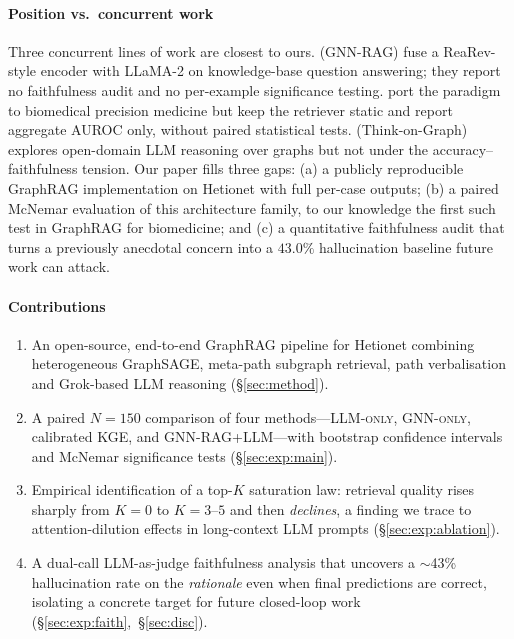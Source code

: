 \documentclass{article}
\newcommand{\ours}{\textsc{GNN-RAG+LLM}\xspace}
\newcommand{\gnno}{\textsc{GNN-only}\xspace}
\newcommand{\llmo}{\textsc{LLM-only}\xspace}
\newcommand{\kge}{\textsc{KGE}\xspace}
\begin{document}
\paragraph{Position vs.\ concurrent work}
Three concurrent lines of work are closest to ours. \citet{mavromatis2024gnnrag} (GNN-RAG) fuse a ReaRev-style encoder with LLaMA-2 on knowledge-base question answering; they report no faithfulness audit and no per-example significance testing. \citet{hays2026raggnn} port the paradigm to biomedical precision medicine but keep the retriever static and report aggregate AUROC only, without paired statistical tests. \citet{sun2024tog} (Think-on-Graph) explores open-domain LLM reasoning over graphs but not under the accuracy--faithfulness tension. Our paper fills three gaps: (a) a publicly reproducible GraphRAG implementation on Hetionet with full per-case outputs; (b) a paired McNemar evaluation of this architecture family, to our knowledge the first such test in GraphRAG for biomedicine; and (c) a quantitative faithfulness audit that turns a previously anecdotal concern into a $43.0\%$ hallucination baseline future work can attack.

\paragraph{Contributions}
\begin{enumerate}[label=(\roman*)]
    \item An open-source, end-to-end GraphRAG pipeline for Hetionet combining heterogeneous GraphSAGE, meta-path subgraph retrieval, path verbalisation and Grok-based LLM reasoning (\S\ref{sec:method}).
    \item A paired $N{=}150$ comparison of four methods---\llmo, \gnno, calibrated \kge, and \ours---with bootstrap confidence intervals and McNemar significance tests (\S\ref{sec:exp:main}).
    \item Empirical identification of a top-$K$ saturation law: retrieval quality rises sharply from $K{=}0$ to $K{=}3$--$5$ and then \emph{declines}, a finding we trace to attention-dilution effects in long-context LLM prompts (\S\ref{sec:exp:ablation}).
    \item A dual-call LLM-as-judge faithfulness analysis that uncovers a $\sim$43\% hallucination rate on the \emph{rationale} even when final predictions are correct, isolating a concrete target for future closed-loop work (\S\ref{sec:exp:faith},~\S\ref{sec:disc}).
\end{enumerate}
\end{document}
